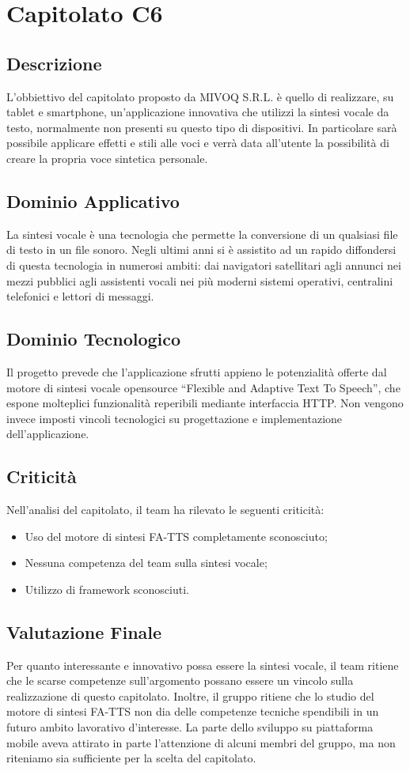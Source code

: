 \newpage
\section{Capitolato C6}
\subsection{Descrizione}
L’obbiettivo del capitolato proposto da MIVOQ S.R.L. è quello di realizzare, su tablet e smartphone, un’applicazione innovativa che utilizzi la sintesi vocale da testo, normalmente non presenti su questo tipo di dispositivi. In particolare sarà possibile applicare effetti e stili alle voci e verrà data all’utente la possibilità di creare la propria voce sintetica personale.

\subsection{Dominio Applicativo}
La sintesi vocale è una tecnologia che permette la conversione di un qualsiasi file di testo in un file sonoro. Negli ultimi anni si è assistito ad un rapido diffondersi di questa tecnologia in numerosi ambiti: dai navigatori satellitari agli annunci nei mezzi pubblici agli assistenti vocali nei più moderni sistemi operativi, centralini telefonici e lettori di messaggi.

\subsection{Dominio Tecnologico}
Il progetto prevede che l’applicazione sfrutti appieno le potenzialità offerte dal motore di sintesi vocale opensource “Flexible and Adaptive Text To Speech”, che espone molteplici funzionalità reperibili mediante interfaccia HTTP. Non vengono invece imposti vincoli tecnologici su progettazione e implementazione dell’applicazione.

\subsection{Criticità}
Nell'analisi del capitolato, il team ha rilevato le seguenti criticità:
\begin{itemize}
\item Uso del motore di sintesi FA-TTS completamente sconosciuto;
\item Nessuna competenza del team sulla sintesi vocale;
\item Utilizzo di framework sconosciuti.
\end{itemize}

\subsection{Valutazione Finale}
Per quanto interessante e innovativo possa essere la sintesi vocale, il team ritiene che le scarse competenze sull’argomento possano essere un vincolo sulla realizzazione di questo capitolato. Inoltre, il gruppo ritiene che lo studio del motore di sintesi FA-TTS non dia delle competenze tecniche spendibili in un futuro ambito lavorativo d’interesse.
La parte dello sviluppo su piattaforma mobile aveva attirato in parte l’attenzione di alcuni membri del gruppo, ma non riteniamo sia sufficiente per la scelta del capitolato.
